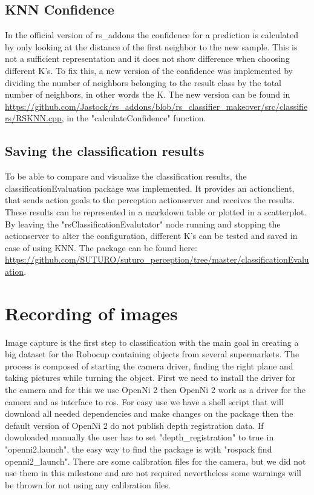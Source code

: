 \documentclass[main.tex]{subfiles}
\begin{document}
			\subsection{KNN Confidence}
			In the official version of rs\_addons the confidence for a prediction is calculated by only looking at the distance of the first neighbor to the new 					sample. This is not a sufficient representation and it does not show difference when choosing different K's. To fix this, a new version of the 						confidence was implemented by dividing the number of neighbors belonging to the result class by the total number of neighbors, in other words the K.
			The new version can be found in \url{https://github.com/Jastock/rs_addons/blob/rs_classifier_makeover/src/classifiers/RSKNN.cpp}, in the 								"calculateConfidence" function.

			\subsection{Saving the classification results}
			To be able to compare and visualize the classification results, the classificationEvaluation package was implemented. It provides an actionclient, that 			sends action goals to the perception actionserver and receives the results. These results can be represented in a markdown table or plotted in a 						scatterplot. By leaving the "rsClassificationEvalutator" node running and stopping the actionserver to alter the configuration, different K's can be 					tested and saved in case of using KNN. The package can be found here: \url{https://github.com/SUTURO/suturo_perception/tree/master/classificationEvaluation}. 


		\section{Recording of images}
		Image capture is the first step to classification with the main goal in creating a big dataset
		for the Robocup containing objects from several supermarkets.
		The process is composed of starting the camera driver,
		finding the right plane and taking pictures while turning the object.
		First we need to install the driver for the camera and for this we use OpenNi 2
		then OpenNi 2 work as a driver for the camera and as interface to ros.
		For easy use we have a shell script that will download all needed dependencies
		and make changes on the package then the default version of OpenNi 2 do
 		not publish depth registration data.
		If downloaded manually the user has to set "depth\_registration" to true in "openni2.launch",
		the easy way to find the package is with "rospack find openni2\_launch".
		There are some calibration files for the camera, but we did not use them in this milestone
		and are not required nevertheless some warnings will be thrown for not using any calibration files.
\end{document}
